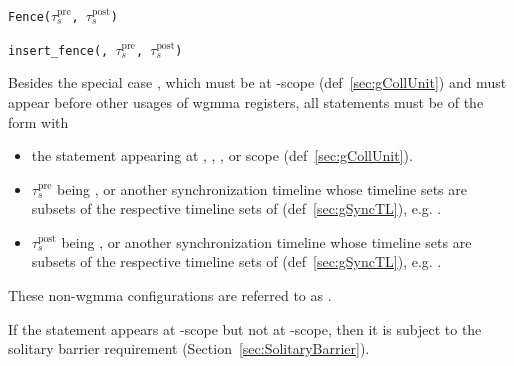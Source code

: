 
\texttt{Fence($\tau_s^\mathrm{pre}$, $\tau_s^\mathrm{post}$)}

\texttt{insert\_fence(, $\tau_s^\mathrm{pre}$, $\tau_s^\mathrm{post}$)}

Besides the special case , which must be at -scope (def~\ref{sec:gCollUnit}) and must appear before other usages of wgmma registers, all  statements must be of the form  with
\begin{itemize}
    \item the statement appearing at , , , or  scope (def~\ref{sec:gCollUnit}).
    \item $\tau_s^\mathrm{pre}$ being , or another synchronization timeline whose timeline sets are subsets of the respective timeline sets of  (def~\ref{sec:gSyncTL}), e.g. .
    \item $\tau_s^\mathrm{post}$ being , or another synchronization timeline whose timeline sets are subsets of the respective timeline sets of  (def~\ref{sec:gSyncTL}), e.g. .
\end{itemize}
These non-wgmma  configurations are referred to as .

If the  statement appears at -scope but not at -scope, then it is subject to the solitary barrier requirement (Section~\ref{sec:SolitaryBarrier}).

